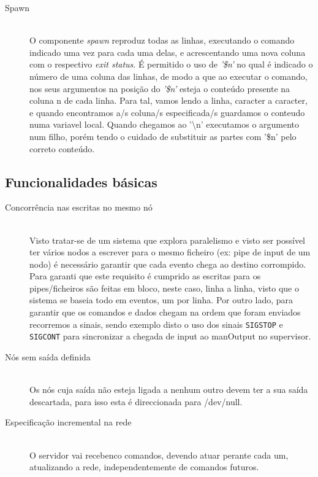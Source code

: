 \documentclass[12pt]{article}
\begin{document}
\begin{description}
\item[Spawn] \hfill \\
    O componente \textit{spawn} reproduz todas as linhas, executando o comando indicado uma vez para cada uma delas, e acrescentando uma nova coluna com o respectivo \textit{exit status}. É permitido o uso de \textit{'\$n'} no qual é indicado o número de uma coluna das linhas, de modo a que ao executar o comando, nos seus argumentos na posição do \textit{'\$n'} esteja o conteúdo presente na coluna n de cada linha. Para tal, vamos lendo a linha, caracter a caracter, e quando encontramos a/s coluna/s especificada/s guardamos o conteudo numa variavel local. Quando chegamos ao '\textbackslash n' executamos o argumento num filho, porém tendo o cuidado de substituir as partes com '\$n' pelo correto conteúdo.  

\end{description} 

\subsection{Funcionalidades básicas}
\begin{description} 

\item[Concorrência nas escritas no mesmo nó] \hfill \\
    Visto tratar-se de um sistema que explora paralelismo e visto ser possível ter vários nodos a escrever para o mesmo ficheiro (ex: pipe de input de um nodo) é necessário garantir que cada evento chega ao destino corrompido. Para garanti que este requisito é cumprido as escritas para os pipes/ficheiros são feitas em bloco, neste caso, linha a linha, visto que o sistema se baseia todo em eventos, um por linha. Por outro lado, para garantir que os comandos e dados chegam na ordem que foram enviados recorremos a sinais, sendo exemplo disto o uso dos sinais \texttt{SIGSTOP} e \texttt{SIGCONT} para sincronizar a chegada de input ao manOutput no supervisor.

\item[Nós sem saída definida] \hfill \\
Os nós cuja saída não esteja ligada a nenhum outro devem ter a sua saída descartada, para isso esta é direccionada para /dev/null.

\item[Especificação incremental na rede] \hfill \\
O servidor vai recebenco comandos, devendo atuar perante cada um, atualizando a rede, independentemente de comandos futuros.

\end{description}
\end{document}
